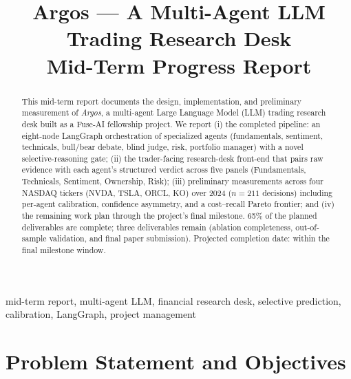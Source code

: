 \documentclass[conference]{IEEEtran}
\begin{document}
\title{Argos --- A Multi-Agent LLM Trading Research Desk\\
\large Mid-Term Progress Report}

\author{
}

\maketitle

\begin{abstract}
This mid-term report documents the design, implementation, and
preliminary measurement of \emph{Argos}, a multi-agent Large
Language Model (LLM) trading research desk built as a Fuse-AI
fellowship project. We report (i) the completed pipeline: an
eight-node LangGraph orchestration of specialized agents
(fundamentals, sentiment, technicals, bull/bear debate, blind judge,
risk, portfolio manager) with a novel selective-reasoning gate;
(ii) the trader-facing research-desk front-end that pairs raw
evidence with each agent's structured verdict across five panels
(Fundamentals, Technicals, Sentiment, Ownership, Risk);
(iii) preliminary measurements across four NASDAQ tickers (NVDA,
TSLA, ORCL, KO) over 2024 ($n{=}211$ decisions) including per-agent
calibration, confidence asymmetry, and a cost--recall Pareto
frontier; and (iv) the remaining work plan through the project's
final milestone. 65\% of the planned deliverables are complete;
three deliverables remain (ablation completeness, out-of-sample
validation, and final paper submission). Projected completion date:
within the final milestone window.
\end{abstract}

\begin{IEEEkeywords}
mid-term report, multi-agent LLM, financial research desk,
selective prediction, calibration, LangGraph, project management
\end{IEEEkeywords}

\section{Problem Statement and Objectives}
\end{document}
